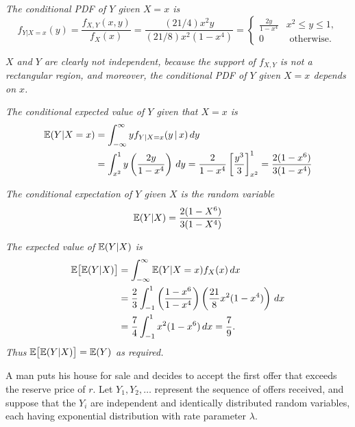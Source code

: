 \begin{exercise}
\begin{questions}
\begin{answer}
\it %
The conditional PDF of $Y$ given $X=x$ is
\[
f_{Y|X=x}(y) 	
	= \frac{f_{X,Y}(x,y)}{f_X(x)} 
	= \frac{(21/4)x^2y}{(21/8)x^2(1-x^4)} 	
	= \begin{cases} 
		\displaystyle\frac{2y}{1-x^4} 	& x^2\leq y\leq 1, \\
	 	0 								& \text{ otherwise}.
	 \end{cases}
\]	 

\it %
$X$ and $Y$ are clearly not independent, because the support of $f_{X,Y}$ is not a rectangular region, and moreover, the conditional PDF of $Y$ given $X=x$ depends on $x$.

\it %
The conditional expected value of $Y$ given that $X=x$ is
\begin{align*}
\mathbb{E}(Y|X=x) 
	& = \int_{-\infty}^{\infty} y f_{Y|X=x}(y\,|\,x)\,dy \\
	& = \int_{x^2}^1 y \left(\frac{2y}{1-x^4}\right)\,dy 
	= \frac{2}{1-x^4}\left[\frac{y^3}{3}\right]_{x^2}^1
	= \frac{2(1-x^6)}{3(1-x^4)} 
\end{align*}	

\it %
The conditional expectation of $Y$ given $X$ is the random variable 
\[
\mathbb{E}(Y|X)=\displaystyle\frac{2(1-X^6)}{3(1-X^4)}
\]

\it %
The expected value of $\mathbb{E}(Y|X)$ is
\begin{align*}
\mathbb{E}\big[\mathbb{E}(Y|X)\big] 
	& = \int_{-\infty}^{\infty} \mathbb{E}(Y|X=x)f_X(x)\,dx \\
	& = \frac{2}{3}\int_{-1}^{1} \left(\frac{1-x^6}{1-x^4}\right)\left(\frac{21}{8}x^2(1-x^4)\right)\,dx \\
	& = \frac{7}{4}\int_{-1}^{1} x^2(1-x^6)\,dx 
	= \frac{7}{9}.
\end{align*}	
Thus $\mathbb{E}\big[\mathbb{E}(Y|X)\big]=\mathbb{E}(Y)$ as required.
\een
\end{answer}

\question
A man puts his house for sale and decides to accept the first offer that exceeds the reserve price of $r$. Let $Y_1,Y_2,\ldots$ represent the sequence of offers received, and suppose that the $Y_i$ are independent and identically distributed random variables, each having exponential distribution with rate parameter $\lambda$. 
\end{questions}
\end{exercise}
